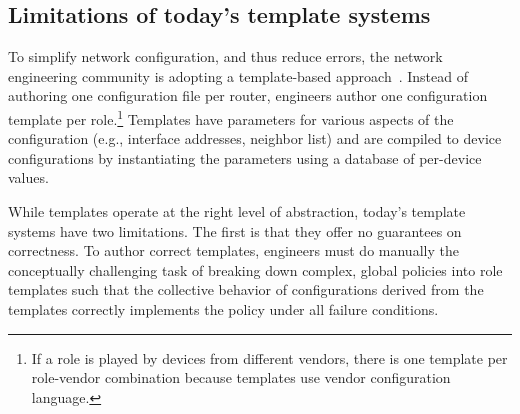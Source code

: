 \documentclass{sig-alternate-10pt}
\begin{document}


\subsection{Limitations of today's template systems}

To simplify network configuration, and thus reduce errors, the network engineering community is adopting a template-based approach~\cite{x,y}. Instead of authoring one configuration file per router, engineers author one configuration template per role.\footnote{If a role is played by devices from different vendors, there is one template per role-vendor combination because templates use vendor configuration language.} Templates have parameters for various aspects of the configuration (e.g., interface addresses, neighbor list) and are compiled to device configurations by instantiating the parameters using a database of per-device values.


While templates operate at the right level of abstraction, today's template systems have two limitations. The first is that they offer no guarantees on correctness. To author correct templates, engineers must do manually the conceptually challenging task of breaking down complex, global policies into role templates such that the collective behavior of configurations derived from the templates correctly implements the policy under all failure conditions.
\end{document}
